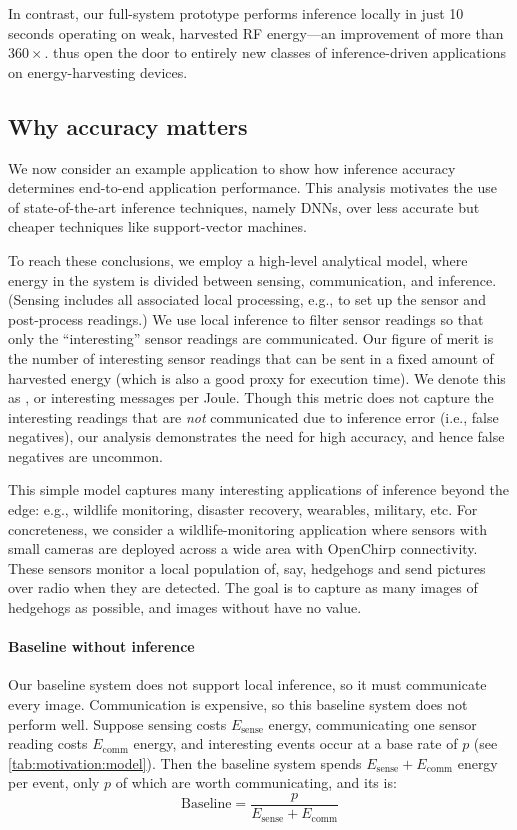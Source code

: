 In contrast, our full-system \sonic prototype performs inference locally
in just 10 seconds operating on weak, harvested RF energy---an
improvement of more than $360\times$. 
%
\sonictails thus open the door to entirely new classes of inference-driven
applications on energy-harvesting devices.

\subsection{Why accuracy matters}

We now consider an example application to show how
inference accuracy determines end-to-end application performance.
%
This analysis motivates the use of state-of-the-art inference
techniques, namely DNNs, over less accurate but
cheaper techniques like support-vector machines.

To reach these conclusions, we employ a high-level analytical model,
where energy in the system is divided between
sensing, communication, and inference.
%
(Sensing includes all associated local processing, e.g., to set up the
sensor and post-process readings.)
%
We use local inference to filter sensor readings so that only the
``interesting'' sensor readings are communicated.
%
Our figure of merit is the number of interesting sensor readings
that can be sent in a fixed amount of harvested energy
(which is also a good proxy for execution time).
%
We denote this as \metric, or interesting messages per Joule.
%
Though this metric does not capture the interesting readings that are
\emph{not} communicated due to inference error (i.e., false
negatives), our analysis demonstrates the need for high accuracy,
and hence false negatives are uncommon.

This simple model captures many interesting applications of inference
beyond the edge: e.g., wildlife monitoring, disaster recovery,
wearables, military, etc.
%
For concreteness, we consider a wildlife-monitoring application where
sensors with small cameras are deployed across a wide area with
OpenChirp connectivity.
%
These sensors monitor a local population of, say, hedgehogs and send
pictures over radio when they are detected.
%
The goal is to capture as many images of hedgehogs as
possible, and images without have no value.

\paragraph{Baseline without inference}
Our baseline system does not support local inference, so it must
communicate every image.
%
Communication is expensive, so this baseline
system does not perform well.
%
Suppose sensing costs $E_\text{sense}$ energy,
communicating one sensor reading costs $E_\text{comm}$ energy,
and interesting events occur at a base rate of $p$
(see \autoref{tab:motivation:model}).
%
Then the baseline system spends $E_\text{sense} + E_\text{comm}$ energy per
event, only $p$ of which are worth communicating, and its \metric is:
\begin{equation}
  \text{Baseline} = \frac{p}{E_\text{sense} + E_\text{comm}}
\end{equation}

